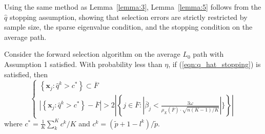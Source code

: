 \documentclass[11pt,review,authoryear]{elsarticle}
\begin{document}
\begin{appendices}
Using the same method as Lemma~\ref{lemma:3}, Lemma~\ref{lemma:5} follows from the $\widehat{q}$ stopping assumption, showing that selection errors are strictly restricted by sample size, the sparse eigenvalue condition, and the stopping condition on the average path.

\begin{lemma}
  Consider the forward selection algorithm on the average $L_{0}$ path with Assumption 1 satisfied. With probability less than $\eta$, if (\ref{eqn:q_hat_stopping}) is satisfied, then
  \[
  \begin{cases}
    \left\{ \mathbf{x}_{j}:\widehat{q}^{k}>c^*\right\} \subset \overline{F}\\
    \left\vert \left\{ \mathbf{x}_{j}:\widehat{q}^{k}>c^*\right\} -  \overline{F} \right\vert > 2 \left\vert \left\{ j \in \overline{F} : \left\vert \overline{\beta}_j < \frac{3 \omega}{\rho_{X}\left(\overline{F}\right) \cdot \sqrt{n\left(K-1\right)/K}} \right\vert \}\right\} \right\vert
  \end{cases}
  \]
  where $c^* = \frac{1}{K} \sum_k^K c^k / K$ and $c^k = \left(\widetilde{p} + 1 - l^k\right) / \widetilde{p}$.
  \label{lemma:5}
\end{lemma}
\clearpage
\end{appendices}
\end{document}
